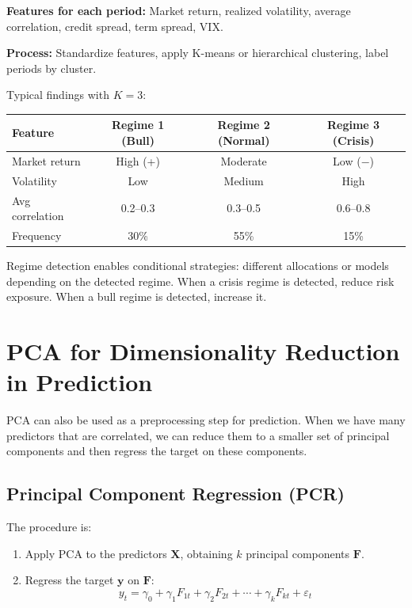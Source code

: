 \documentclass[11pt,a4paper]{article}
\begin{document}
\textbf{Features for each period:} Market return, realized volatility, average correlation, credit spread, term spread, VIX.

\textbf{Process:} Standardize features, apply K-means or hierarchical clustering, label periods by cluster.

Typical findings with $K=3$:

\begin{center}
\begin{tabular}{lccc}
\toprule
\textbf{Feature} & \textbf{Regime 1 (Bull)} & \textbf{Regime 2 (Normal)} & \textbf{Regime 3 (Crisis)} \\
\midrule
Market return & High (+) & Moderate & Low ($-$) \\
Volatility & Low & Medium & High \\
Avg correlation & 0.2--0.3 & 0.3--0.5 & 0.6--0.8 \\
Frequency & 30\% & 55\% & 15\% \\
\bottomrule
\end{tabular}
\end{center}

Regime detection enables conditional strategies: different allocations or models depending on the detected regime. When a crisis regime is detected, reduce risk exposure. When a bull regime is detected, increase it.

\section{PCA for Dimensionality Reduction in Prediction}

PCA can also be used as a preprocessing step for prediction. When we have many predictors that are correlated, we can reduce them to a smaller set of principal components and then regress the target on these components.

\subsection{Principal Component Regression (PCR)}

The procedure is:
\begin{enumerate}
    \item Apply PCA to the predictors $\mathbf{X}$, obtaining $k$ principal components $\mathbf{F}$.
    \item Regress the target $\mathbf{y}$ on $\mathbf{F}$:
    \[
    y_t = \gamma_0 + \gamma_1 F_{1t} + \gamma_2 F_{2t} + \cdots + \gamma_k F_{kt} + \varepsilon_t
    \]
\end{enumerate}
\end{document}
